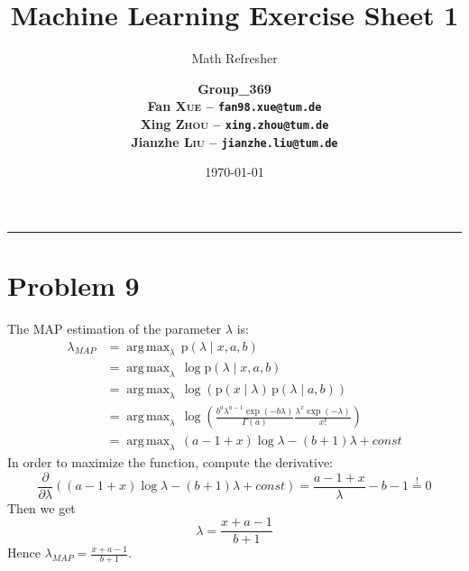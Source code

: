 \documentclass[12pt]{scrartcl}
\title{\large Machine Learning Exercise Sheet 1}
\subtitle{\Large Math Refresher}
\author{\large\bfseries Group\_369 \\
        \large Fan \textsc{Xue} -- \texttt{fan98.xue@tum.de} \\
        \large Xing \textsc{Zhou} -- \texttt{xing.zhou@tum.de} \\
        \large Jianzhe \textsc{Liu} -- \texttt{jianzhe.liu@tum.de}}
\date{\large \today}
\DeclareMathOperator*{\argmax}{arg\,max}
\newcommand{\p}[1][\mathrm{p}]{\mathrm{#1}}
\begin{document}
  
  \maketitle
  \vspace{-1cm}
  \noindent\rule{\textwidth}{0.4pt}
  
  \section*{Problem 9}
  
  The MAP estimation of the parameter $\lambda$ is:  
  \begin{equation*}
    \begin{split}
      \lambda_{MAP} &= \argmax_\lambda\,\p(\lambda\mid x, a, b) \\
                    &= \argmax_\lambda\,\log \p(\lambda\mid x, a, b) \\
                    &= \argmax_\lambda\,\log (\p(x\mid\lambda)\,\p(\lambda\mid a,b)) \\
                    &= \argmax_\lambda\,\log (\frac{b^a \lambda^{a-1} \exp(-b\lambda)}{\Gamma(a)} \frac{\lambda^x \exp(-\lambda)}{x!}) \\
                    &= \argmax_\lambda\,(a-1+x)\log \lambda -(b+1)\lambda + const 
    \end{split}
  \end{equation*}
  In order to maximize the function, compute the derivative:
  \begin{equation*}
    \frac{\partial}{\partial\lambda}((a-1+x)\log \lambda -(b+1)\lambda + const) = \frac{a-1+x}{\lambda}-b-1 \stackrel{!}{=} 0
  \end{equation*}
  Then we get
  \begin{equation*}
    \lambda = \frac{x+a-1}{b+1}
  \end{equation*}
  Hence $\lambda_{MAP}=\frac{x+a-1}{b+1}$.


  
\end{document}
